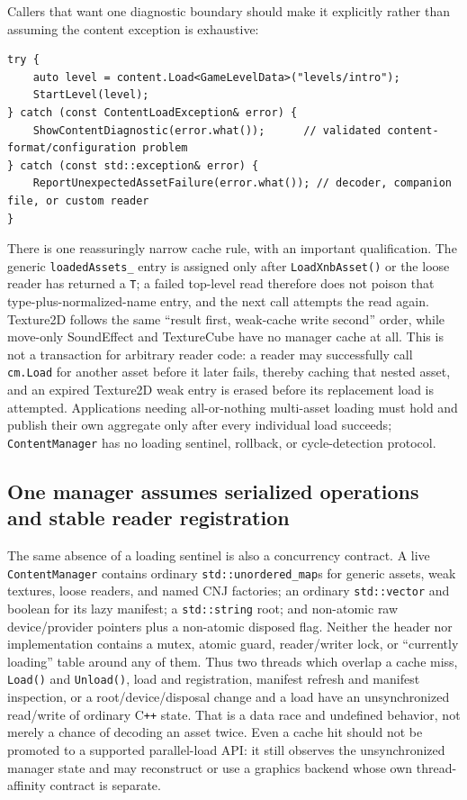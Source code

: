 Callers that want one diagnostic boundary should make it explicitly rather than assuming the
content exception is exhaustive:

\begin{lstlisting}
try {
    auto level = content.Load<GameLevelData>("levels/intro");
    StartLevel(level);
} catch (const ContentLoadException& error) {
    ShowContentDiagnostic(error.what());      // validated content-format/configuration problem
} catch (const std::exception& error) {
    ReportUnexpectedAssetFailure(error.what()); // decoder, companion file, or custom reader
}
\end{lstlisting}

There is one reassuringly narrow cache rule, with an important qualification. The generic
\texttt{loadedAssets\_} entry is assigned only after \texttt{LoadXnbAsset()} or the loose
reader has returned a \texttt{T}; a failed top-level read therefore does not poison that
type-plus-normalized-name entry, and the next call attempts the read again. Texture2D follows
the same ``result first, weak-cache write second'' order, while move-only SoundEffect and
TextureCube have no manager cache at all. This is not a transaction for arbitrary reader code:
a reader may successfully call \texttt{cm.Load} for another asset before it later fails, thereby
caching that nested asset, and an expired Texture2D weak entry is erased before its replacement
load is attempted. Applications needing all-or-nothing multi-asset loading must hold and publish
their own aggregate only after every individual load succeeds; \texttt{ContentManager} has no
loading sentinel, rollback, or cycle-detection protocol.

\subsection{One manager assumes serialized operations and stable reader registration}

The same absence of a loading sentinel is also a concurrency contract. A live
\texttt{ContentManager} contains ordinary \texttt{std::unordered\_map}s for generic assets,
weak textures, loose readers, and named CNJ factories; an ordinary \texttt{std::vector} and
boolean for its lazy manifest; a \texttt{std::string} root; and non-atomic raw device/provider
pointers plus a non-atomic disposed flag. Neither the header nor implementation contains a mutex,
atomic guard, reader/writer lock, or ``currently loading'' table around any of them. Thus two
threads which overlap a cache miss, \texttt{Load()} and \texttt{Unload()}, load and registration,
manifest refresh and manifest inspection, or a root/device/disposal change and a load have an
unsynchronized read/write of ordinary C\texttt{++} state. That is a data race and undefined
behavior, not merely a chance of decoding an asset twice. Even a cache hit should not be promoted
to a supported parallel-load API: it still observes the unsynchronized manager state and may
reconstruct or use a graphics backend whose own thread-affinity contract is separate.

